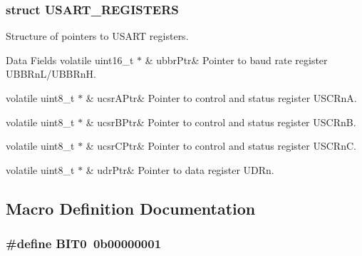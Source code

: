 \subsubsection{struct U\+S\+A\+R\+T\+\_\+\+R\+E\+G\+I\+S\+T\+E\+RS}
Structure of pointers to U\+S\+A\+RT registers. \begin{DoxyFields}{Data Fields}
volatile uint16\+\_\+t $\ast$\hypertarget{group__usart_async_module_afe25499475da410fa8325bf7570c0c15}{}\label{group__usart_async_module_afe25499475da410fa8325bf7570c0c15}
&
ubbr\+Ptr&
Pointer to baud rate register U\+B\+B\+Rn\+L/\+U\+B\+B\+RnH. \\
\hline

volatile uint8\+\_\+t $\ast$\hypertarget{group__usart_async_module_a062b053bfdddcb231cd1b219d477becf}{}\label{group__usart_async_module_a062b053bfdddcb231cd1b219d477becf}
&
ucsr\+A\+Ptr&
Pointer to control and status register U\+S\+C\+RnA. \\
\hline

volatile uint8\+\_\+t $\ast$\hypertarget{group__usart_async_module_ac67a77143b9e96db567bd0da0fb04c41}{}\label{group__usart_async_module_ac67a77143b9e96db567bd0da0fb04c41}
&
ucsr\+B\+Ptr&
Pointer to control and status register U\+S\+C\+RnB. \\
\hline

volatile uint8\+\_\+t $\ast$\hypertarget{group__usart_async_module_ab5b5f88ddb38717710222f456d33f64a}{}\label{group__usart_async_module_ab5b5f88ddb38717710222f456d33f64a}
&
ucsr\+C\+Ptr&
Pointer to control and status register U\+S\+C\+RnC. \\
\hline

volatile uint8\+\_\+t $\ast$\hypertarget{group__usart_async_module_a5e90b4987509df93580223310ee175e7}{}\label{group__usart_async_module_a5e90b4987509df93580223310ee175e7}
&
udr\+Ptr&
Pointer to data register U\+D\+Rn. \\
\hline

\end{DoxyFields}


\subsection{Macro Definition Documentation}
\subsubsection[{\texorpdfstring{B\+I\+T0}{BIT0}}]{\setlength{\rightskip}{0pt plus 5cm}\#define B\+I\+T0~0b00000001}\hypertarget{group__usart_async_module_gad4d43f8748b542bce39e18790f845ecc}{}\label{group__usart_async_module_gad4d43f8748b542bce39e18790f845ecc}
